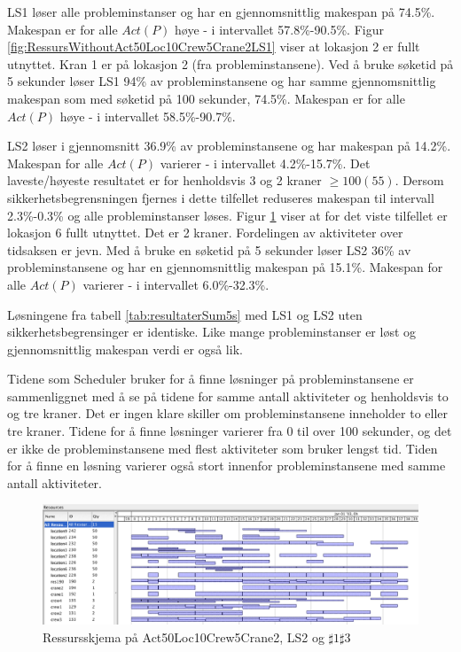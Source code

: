 LS1 løser alle probleminstanser og har en gjennomsnittlig makespan på 74.5\%. Makespan er for alle $Act(P)$ høye - i intervallet 57.8\%-90.5\%. Figur \ref{fig:RessursWithoutAct50Loc10Crew5Crane2LS1} viser at lokasjon 2 er fullt utnyttet. Kran 1 er på lokasjon 2 (fra probleminstansene). Ved å bruke søketid på 5 sekunder løser LS1 94\% av probleminstansene og har samme gjennomsnittlig makespan som med søketid på 100 sekunder, 74.5\%. Makespan er for alle $Act(P)$ høye - i intervallet 58.5\%-90.7\%.

LS2 løser i gjennomsnitt 36.9\% av probleminstansene og har makespan på 14.2\%. Makespan for alle $Act(P)$ varierer - i intervallet 4.2\%-15.7\%. Det laveste/høyeste resultatet er for henholdsvis 3 og 2 kraner $\ge 100(55)$. Dersom sikkerhetsbegrensningen fjernes i dette tilfellet reduseres makespan til intervall 2.3\%-0.3\% og alle probleminstanser løses. Figur \ref{fig:ResourceAct50Crane2LS2_UtenVarme_100s} viser at for det viste tilfellet er lokasjon 6 fullt utnyttet. Det er 2 kraner. Fordelingen av aktiviteter over tidsaksen er jevn. Med å bruke en søketid på 5 sekunder løser LS2 36\% av probleminstansene og har en gjennomsnittlig makespan på 15.1\%. Makespan for alle $Act(P)$ varierer - i intervallet 6.0\%-32.3\%.

Løsningene fra tabell \ref{tab:resultaterSum5s} med LS1 og LS2 uten sikkerhetsbegrensinger er identiske. Like mange probleminstanser er løst og gjennomsnittlig makespan verdi er også lik.

Tidene som Scheduler bruker for å finne løsninger på probleminstansene er sammenliggnet med å se på tidene for samme antall aktiviteter og henholdsvis to og tre kraner. Det er ingen klare skiller om probleminstansene inneholder to eller tre kraner. Tidene for å finne løsninger varierer fra 0 til over 100 sekunder, og det er ikke de probleminstansene med flest aktiviteter som bruker lengst tid. Tiden for å finne en løsning varierer også stort innenfor probleminstansene med samme antall aktiviteter.
\begin{figure}[!h]
\centering
\includegraphics[scale=0.4]{content/gfx/ResourceAct50Crane2LS2_UtenVarme_100s}
\caption{Ressursskjema på Act50Loc10Crew5Crane2, LS2 og $\sharp1\sharp3$}
\label{fig:ResourceAct50Crane2LS2_UtenVarme_100s}
\end{figure}

